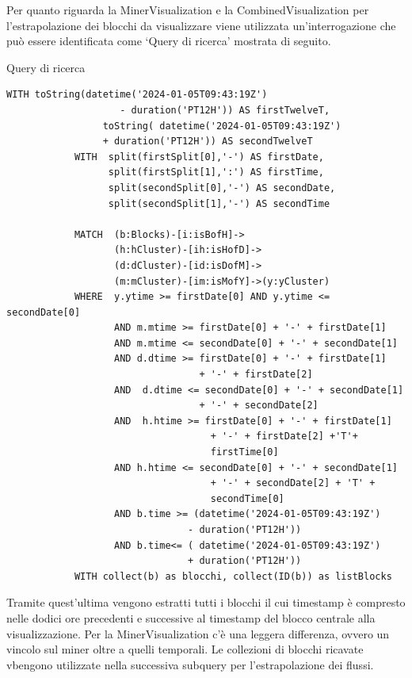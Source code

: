 Per quanto riguarda la MinerVisualization e la CombinedVisualization per l'estrapolazione dei blocchi da visualizzare viene utilizzata un'interrogazione che può essere identificata come `Query di ricerca' mostrata di seguito.
\newpage \thispagestyle{mystyle}
\begin{center}
Query di ricerca
\begin{lstlisting}[basicstyle = \small]
            WITH toString(datetime('2024-01-05T09:43:19Z') 
                    - duration('PT12H')) AS firstTwelveT,
                 toString( datetime('2024-01-05T09:43:19Z') 
                 + duration('PT12H')) AS secondTwelveT
            WITH  split(firstSplit[0],'-') AS firstDate,
                  split(firstSplit[1],':') AS firstTime,
                  split(secondSplit[0],'-') AS secondDate,
                  split(secondSplit[1],'-') AS secondTime
                  
            MATCH  (b:Blocks)-[i:isBofH]->
                   (h:hCluster)-[ih:isHofD]->
                   (d:dCluster)-[id:isDofM]->
                   (m:mCluster)-[im:isMofY]->(y:yCluster)
            WHERE  y.ytime >= firstDate[0] AND y.ytime <= secondDate[0] 
                   AND m.mtime >= firstDate[0] + '-' + firstDate[1] 
                   AND m.mtime <= secondDate[0] + '-' + secondDate[1] 
                   AND d.dtime >= firstDate[0] + '-' + firstDate[1] 
                                  + '-' + firstDate[2]
                   AND  d.dtime <= secondDate[0] + '-' + secondDate[1] 
                                  + '-' + secondDate[2]
                   AND  h.htime >= firstDate[0] + '-' + firstDate[1] 
                                    + '-' + firstDate[2] +'T'+ 
                                    firstTime[0]
                   AND h.htime <= secondDate[0] + '-' + secondDate[1] 
                                    + '-' + secondDate[2] + 'T' + 
                                    secondTime[0]
                   AND b.time >= (datetime('2024-01-05T09:43:19Z') 
                                - duration('PT12H'))
                   AND b.time<= ( datetime('2024-01-05T09:43:19Z') 
                                + duration('PT12H'))
            WITH collect(b) as blocchi, collect(ID(b)) as listBlocks
\end{lstlisting} 
\end{center}

Tramite quest'ultima vengono estratti tutti i blocchi il cui timestamp è compresto nelle dodici ore precedenti e successive al timestamp del blocco centrale alla visualizzazione.
Per la MinerVisualization c'è una leggera differenza, ovvero un vincolo sul miner oltre a quelli temporali.
Le collezioni di blocchi ricavate vbengono utilizzate nella successiva subquery per l'estrapolazione dei flussi.
\newpage \thispagestyle{mystyle}

